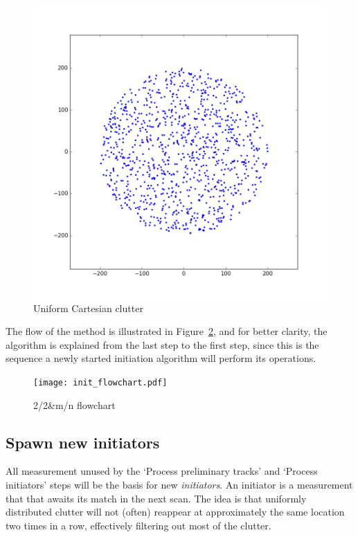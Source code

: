 \begin{figure}[H]
\begin{minipage}{0.45\textwidth}
\includegraphics[width=\textwidth]{Figures/clutterCartesian.png}
\caption{Uniform Cartesian clutter}\label{fig:clutter_cartesian}
\end{minipage}
\end{figure}
The flow of the method is illustrated in Figure~\ref{fig:init_flowchart}, and for better clarity, the algorithm is explained from the last step to the first step, since this is the sequence a newly started initiation algorithm will perform its operations.
\begin{figure}[H]
\centering
\texttt{[image: init\_flowchart.pdf]}
\caption{2/2\&m/n flowchart}\label{fig:init_flowchart}
\end{figure}

\subsection{Spawn new initiators}
All measurement unused by the `Process preliminary tracks' and `Process initiators' steps will be the basis for new \emph{initiators}. An initiator is a measurement that that awaits its match in the next scan. The idea is that uniformly distributed clutter will not (often) reappear at approximately the same location two times in a row, effectively filtering out most of the clutter.


